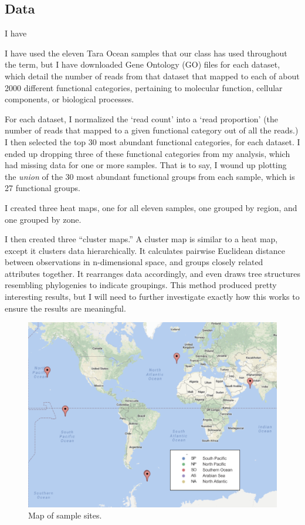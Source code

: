 \documentclass[12pt,a4paper,]{article}
\begin{document}
\subsection{Data}\label{data}

I have

I have used the eleven Tara Ocean samples that our class has used
throughout the term, but I have downloaded Gene Ontology (GO) files for
each dataset, which detail the number of reads from that dataset that
mapped to each of about 2000 different functional categories, pertaining
to molecular function, cellular components, or biological processes.

For each dataset, I normalized the `read count' into a `read proportion'
(the number of reads that mapped to a given functional category out of
all the reads.) I then selected the top 30 most abundant functional
categories, for each dataset. I ended up dropping three of these
functional categories from my analysis, which had missing data for one
or more samples. That is to say, I wound up plotting the \emph{union} of
the 30 most abundant functional groups from each sample, which is 27
functional groups.

I created three heat maps, one for all eleven samples, one grouped by
region, and one grouped by zone.

I then created three ``cluster maps.'' A cluster map is similar to a
heat map, except it clusters data hierarchically. It calculates pairwise
Euclidean distance between observations in n-dimensional space, and
groups closely related attributes together. It rearranges data
accordingly, and even draws tree structures resembling phylogenies to
indicate groupings. This method produced pretty interesting results, but
I will need to further investigate exactly how this works to ensure the
results are meaningful.

\begin{figure}
\centering
\includegraphics{imgs/map.png}
\caption{Map of sample sites.\label{fig:map}}
\end{figure}
\end{document}
